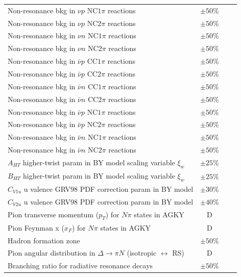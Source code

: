 \begin{longtable}{l c c c}
  Non-resonance bkg in $\nu p$ NC$1\pi$ reactions & $\pm50\%$ & & \\
  Non-resonance bkg in $\nu p$ NC$2\pi$ reactions & $\pm50\%$ & & \\
  Non-resonance bkg in $\nu n$ NC$1\pi$ reactions & $\pm50\%$ & & \\
  Non-resonance bkg in $\nu n$ NC$2\pi$ reactions & $\pm50\%$ & & \\
  Non-resonance bkg in $\bar{\nu} p$ CC$1\pi$ reactions & $\pm50\%$ & & \\
  Non-resonance bkg in $\bar{\nu} p$ CC$2\pi$ reactions & $\pm50\%$ & & \\
  Non-resonance bkg in $\bar{\nu} n$ CC$1\pi$ reactions & $\pm50\%$ & & \\
  Non-resonance bkg in $\bar{\nu} n$ CC$2\pi$ reactions & $\pm50\%$ & & \\
  Non-resonance bkg in $\bar{\nu} p$ NC$1\pi$ reactions & $\pm50\%$ & & \\
  Non-resonance bkg in $\bar{\nu} p$ NC$2\pi$ reactions & $\pm50\%$ & & \\
  Non-resonance bkg in $\bar{\nu} n$ NC$1\pi$ reactions & $\pm50\%$ & & \\
  Non-resonance bkg in $\bar{\nu} n$ NC$2\pi$ reactions & $\pm50\%$ & & \\
  $A_{HT}$ higher-twist param in BY model scaling variable $\xi_w$ & $\pm25\%$ & & \\
  $B_{HT}$ higher-twist param in BY model scaling variable $\xi_w$ & $\pm25\%$ & & \\
  $C_{V1u}$ u valence GRV98 PDF correction param in BY model & $\pm30\%$ & & \\
  $C_{V2u}$ u valence GRV98 PDF correction param in BY model & $\pm40\%$ & & \\
  Pion transverse momentum ($p_T$) for $N\pi$ states in AGKY & D & & \\
  Pion Feynman x ($x_F$) for $N\pi$ states in AGKY & D & & \\
  Hadron formation zone & $\pm50\%$ & & \\
  Pion angular distribution in $\Delta \rightarrow \pi N$ (isotropic $\leftrightarrow$ RS) & D & & \\
  Branching ratio for radiative resonance decays & $\pm50\%$ & & \\

\end{longtable}

